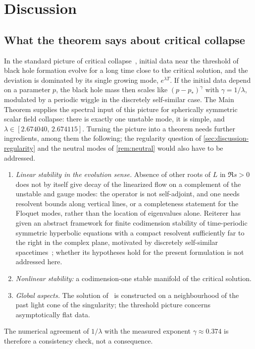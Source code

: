 \section{Discussion}\label{sec:discussion}

\subsection{What the theorem says about critical collapse}

In the standard picture of critical collapse~\cite{GundlachMartinGarcia2007}, initial data near the threshold of
black hole formation evolve for a long time close to the critical solution, and the deviation is dominated by its
single growing mode, $e^{\lambda T}$. If the initial data depend on a parameter $p$, the black hole mass then
scales like $(p-p_*)^\gamma$ with $\gamma=1/\lambda$, modulated by a periodic wiggle in the discretely self-similar
case. The Main Theorem supplies the spectral input of this picture for spherically symmetric scalar field
collapse: there is exactly one unstable mode, it is simple, and $\lambda\in[2.674040,\,2.674115]$. Turning the
picture into a theorem needs further ingredients, among them the following; the regularity question of
\cref{sec:discussion-regularity} and the neutral modes of \cref{rem:neutral} would also have to be addressed.
\begin{enumerate}[label=(\alph*),leftmargin=*]
\item \emph{Linear stability in the evolution sense.} Absence of other roots of $L$ in $\Re s>0$ does not by
  itself give decay of the linearized flow on a complement of the unstable and gauge modes: the operator is not
  self-adjoint, and one needs resolvent bounds along vertical lines, or a completeness statement for the Floquet
  modes, rather than the location of eigenvalues alone. Reiterer has given an abstract framework for finite
  codimension stability of time-periodic symmetric hyperbolic equations with a compact resolvent sufficiently far to the right in the complex
  plane, motivated by discretely self-similar spacetimes~\cite{Reiterer2015}; whether its hypotheses hold for the
  present formulation is not addressed here.
\item \emph{Nonlinear stability:} a codimension-one stable manifold of the critical solution.
\item \emph{Global aspects.} The solution of~\cite{RT2019} is constructed on a neighbourhood of the past light cone
  of the singularity; the threshold picture concerns asymptotically flat data.
\end{enumerate}
The numerical agreement of $1/\lambda$ with the measured exponent $\gamma\approx0.374$ is therefore a consistency
check, not a consequence.

